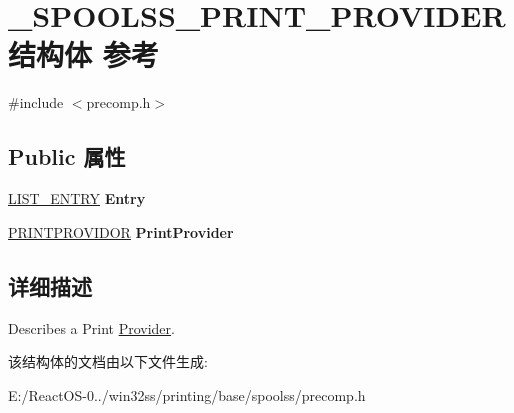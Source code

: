 \hypertarget{struct___s_p_o_o_l_s_s___p_r_i_n_t___p_r_o_v_i_d_e_r}{}\section{\+\_\+\+S\+P\+O\+O\+L\+S\+S\+\_\+\+P\+R\+I\+N\+T\+\_\+\+P\+R\+O\+V\+I\+D\+E\+R结构体 参考}
\label{struct___s_p_o_o_l_s_s___p_r_i_n_t___p_r_o_v_i_d_e_r}


{\ttfamily \#include $<$precomp.\+h$>$}

\subsection*{Public 属性}
\begin{DoxyCompactItemize}
\item 
\mbox{\label{struct___s_p_o_o_l_s_s___p_r_i_n_t___p_r_o_v_i_d_e_r_a23e631dda6bd7a5be6ba89718699acbe}} 
\hyperlink{struct___l_i_s_t___e_n_t_r_y}{L\+I\+S\+T\+\_\+\+E\+N\+T\+RY} {\bfseries Entry}
\item 
\mbox{\label{struct___s_p_o_o_l_s_s___p_r_i_n_t___p_r_o_v_i_d_e_r_aa8f1c4128e6954f50d83f2bd31c54107}} 
\hyperlink{struct___p_r_i_n_t_p_r_o_v_i_d_o_r}{P\+R\+I\+N\+T\+P\+R\+O\+V\+I\+D\+OR} {\bfseries Print\+Provider}
\end{DoxyCompactItemize}


\subsection{详细描述}
Describes a Print \hyperlink{class_provider}{Provider}. 

该结构体的文档由以下文件生成\+:\begin{DoxyCompactItemize}
\item 
E\+:/\+React\+O\+S-\/0../win32ss/printing/base/spoolss/precomp.\+h\end{DoxyCompactItemize}
